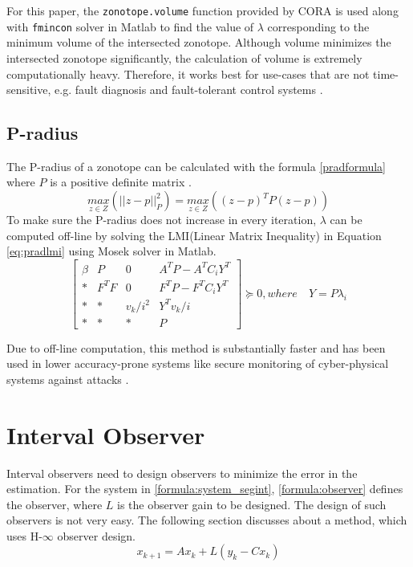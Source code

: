 For this paper, the \texttt{zonotope.volume} function provided by CORA is used along with \texttt{fmincon} solver in Matlab\textsuperscript{\tiny\textregistered} to find the value of $\lambda$ corresponding to the minimum volume of the intersected zonotope. Although volume minimizes the intersected zonotope significantly, the calculation of volume is extremely computationally heavy. Therefore, it works best for use-cases that are not time-sensitive, e.g. fault diagnosis and fault-tolerant control systems \cite{Puig2010}. 
\subsection{P-radius}
The P-radius of a zonotope can be calculated with the formula \eqref{pradformula} where $P$ is a positive definite matrix \cite{Alamo2005}.
\begin{equation}
\label{pradformula}
\underset{z \in Z}{max} (||z - p||^2_{P}) = \underset{z \in Z}{max}((z-p)^T P (z-p))
\end{equation}
To make sure the P-radius does not increase in every iteration, $\lambda$ can be computed off-line by solving the LMI(Linear Matrix Inequality) in Equation \eqref{eq:pradlmi} using Mosek solver in Matlab\textsuperscript{\tiny\textregistered}.
\begin{equation}
\label{eq:pradlmi}
\left[
\begin{matrix}
\beta & P & 0 & A^TP - A^TC_iY^T\\
* & F^TF & 0 & F^TP -F^TC_iY^T\\
* & * & v_k/i ^2 & Y^Tv_k/i\\
* & * & * & P
\end{matrix}\right] \succeq 0,
where\quad Y = P\lambda_i
\end{equation}

Due to off-line computation, this method is substantially faster and has been used in lower accuracy-prone systems like secure monitoring of cyber-physical systems against attacks \cite{GE20201592}.

\section{Interval Observer}
Interval observers need to design observers to minimize the error in the estimation. For the system in \eqref{formula:system_segint}, \eqref{formula:observer} defines the observer, where $L$ is the observer gain to be designed. The design of such observers is not very easy. The following section discusses about a method, which uses H-$\infty$ observer design.
\begin{equation}
\label{formula:observer}
x_{k+1} = Ax_k + L(y_k -Cx_k)
\end{equation}


